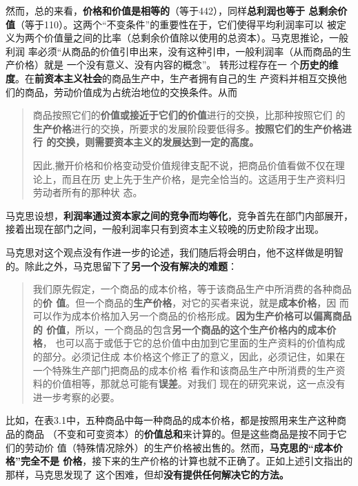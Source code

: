  然而，总的来看，\textbf{价格和价值是相等的}（等于442），同样\textbf{总利润也等于
   总剩余价值}（等于110）。这两个“不变条件”的重要性在于，它们使得平均利润率可以
 被定义为两个价值量之间的比率（总剩余价值除以使用的总资本）。马克思推论，一般利润
 率必须“从商品的价值引申出来，没有这种引申，一般利润率（从而商品的生产价格）就是
 一个没有意义、没有内容的概念”。 转形过程存在一
 个\textbf{历史的维度}。在\textbf{前资本主义社会}的商品生产中，生产者拥有自己的生
 产资料并相互交换他们的商品，劳动价值成为占统治地位的交换条件。从而
\begin{quotation}
  商品按照它们的\textbf{价值或接近于它们的价值}进行的交换，比那种按照它们
  的\textbf{生产价格}进行的交换，所要求的发展阶段要低得多。\textbf{按照它们的生产价格进行
  的交换，则需要资本主义的发展达到一定的高度。}

  因此,撇开价格和价格变动受价值规律支配不说，把商品价值看做不仅在理论上，而且在历
  史上先于生产价格，是完全恰当的。这适用于生产资料归劳动者所有的那种状
  态。
\end{quotation}

马克思设想，\textbf{利润率通过资本家之间的竞争而均等化}，竞争首先在部门内部展开，
接着出现在部门之间，一般利润率只有到资本主义较晚的历史阶段才出现。

马克思对这个观点没有作进一步的论述，我们随后将会明白，他不这样做是明智的。除此之外，马克思留下了\textbf{另一个没有解决的难题}：
\begin{quotation}
  我们原先假定，一个商品的成本价格，等于该商品生产中所消费的各种商品的\textbf{价
    值}。但一个商品的\textbf{生产价格}，对它的买者来说，就是\textbf{成本价格}，因
  而可以作为成本价格加入另一个商品的价格形成。\textbf{因为生产价格可以偏离商品的
    价值}，所以，一个商品的包含\textbf{另一个商品的这个生产价格内的成本价格}，
  也可以高于或低于它的总价值中由加到它里面的生产资料的价值构成的部分。必须记住成
  本价格这个修正了的意义，因此，必须记住，如果在一个特殊生产部门把商品的成本价格
  看作和该商品生产中所消费的生产资料的价值相等，那就总可能有\textbf{误差}。对我们
  现在的研究来说，这一点没有进一步考察的必要。
\end{quotation}

比如，在表3.1中，五种商品中每一种商品的成本价格，都是按照用来生产这种商品的商品
（不变和可变资本）的\textbf{价值总和}来计算的。但是这些商品是按不同于它们的劳动价
值（特殊情况除外）的生产价格被出售的。然而，\textbf{马克思的“成本价格”完全不是
  价格}，接下来的生产价格的计算也就不正确了。正如上述引文指出的那样，马克思发现了
这个困难，但却\textbf{没有提供任何解决它的方法。}

